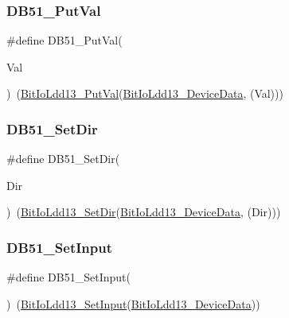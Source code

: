 \subsubsection{\texorpdfstring{D\+B51\+\_\+\+Put\+Val}{DB51\_PutVal}}
{\footnotesize\ttfamily \#define D\+B51\+\_\+\+Put\+Val(\begin{DoxyParamCaption}\item[{}]{Val }\end{DoxyParamCaption})~(\hyperlink{group___bit_io_ldd13__module_ga9e36ef0c8392418090d73328ba1b1d72}{Bit\+Io\+Ldd13\+\_\+\+Put\+Val}(\hyperlink{group___bit_io_ldd13__module_gaced3b535c8325a9d8bcaa5fcc7de35d7}{Bit\+Io\+Ldd13\+\_\+\+Device\+Data}, (Val)))}

\mbox{\label{group___d_b51__module_ga6c9f2f688f7237c92652bf2acdba1534}} 
\subsubsection{\texorpdfstring{D\+B51\+\_\+\+Set\+Dir}{DB51\_SetDir}}
{\footnotesize\ttfamily \#define D\+B51\+\_\+\+Set\+Dir(\begin{DoxyParamCaption}\item[{}]{Dir }\end{DoxyParamCaption})~(\hyperlink{group___bit_io_ldd13__module_gaa510bc6987ce93bf7a866b1766f1a382}{Bit\+Io\+Ldd13\+\_\+\+Set\+Dir}(\hyperlink{group___bit_io_ldd13__module_gaced3b535c8325a9d8bcaa5fcc7de35d7}{Bit\+Io\+Ldd13\+\_\+\+Device\+Data}, (Dir)))}

\mbox{\label{group___d_b51__module_gafa57a93e4b8c61f7989927f08c0046e9}} 
\subsubsection{\texorpdfstring{D\+B51\+\_\+\+Set\+Input}{DB51\_SetInput}}
{\footnotesize\ttfamily \#define D\+B51\+\_\+\+Set\+Input(\begin{DoxyParamCaption}{ }\end{DoxyParamCaption})~(\hyperlink{group___bit_io_ldd13__module_gac89f06fe1f95f685923b6f13ab290526}{Bit\+Io\+Ldd13\+\_\+\+Set\+Input}(\hyperlink{group___bit_io_ldd13__module_gaced3b535c8325a9d8bcaa5fcc7de35d7}{Bit\+Io\+Ldd13\+\_\+\+Device\+Data}))}

